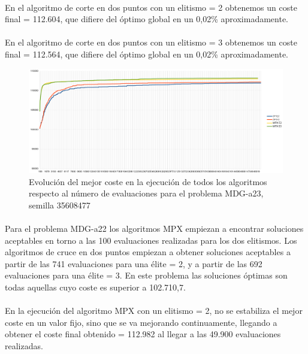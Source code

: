 	\paragraph{}En el algoritmo de corte en dos puntos con un elitismo = 2 obtenemos un coste final = 112.604, que difiere del óptimo global en un 0,02\% aproximadamente.
	
	\paragraph{}En el algoritmo de corte en dos puntos con un elitismo = 3 obtenemos un coste final = 112.564, que difiere del óptimo global en un 0,02\% aproximadamente.

	\begin{figure}[H]
		\centering
		\includegraphics[scale=0.3]{img/35608477_MDG-a_23_n2000_m200.png}
		\caption{Evolución del mejor coste en la ejecución de todos los algoritmos respecto al número de evaluaciones para el problema MDG-a23, semilla 35608477}
		\label{MDG-a_23_historico}
	\end{figure}

	\paragraph{}Para el problema MDG-a22 los algoritmos MPX empiezan a encontrar soluciones aceptables en torno a las 100 evaluaciones realizadas para los dos elitismos. Los algoritmos de cruce en dos puntos empiezan a obtener soluciones aceptables a partir de las 741 evaluaciones para una élite = 2, y a partir de las 692 evaluaciones para una élite = 3. En este problema las soluciones óptimas son todas aquellas cuyo coste es superior a 102.710,7.
	
	\paragraph{}En la ejecución del algoritmo MPX con un elitismo = 2, no se estabiliza el mejor coste en un valor fijo, sino que se va mejorando continuamente, llegando a obtener el coste final obtenido = 112.982 al llegar a las 49.900 evaluaciones realizadas.
	
